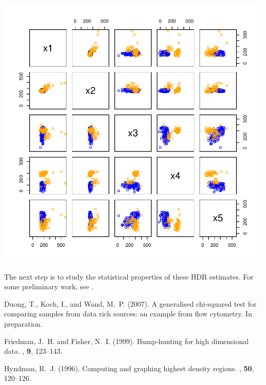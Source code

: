 \documentclass[a4paper,11pt]{article}
\begin{document}
\begin{Schunk}
\end{Schunk}

\begin{center}
\includegraphics{prim-014}
\end{center}

The next step is to study the statistical properties of these HDR estimates.
For some preliminary work, see \cite*{duong07b}.




\begin{thebibliography}{}

Duong, T., Koch, I., and Wand, M.~P. (2007).
\newblock A generalised chi-squared test for comparing samples from data rich
  sources: an example from flow cytometry.
\newblock In preparation.

Friedman, J.~H. and Fisher, N.~I. (1999).
\newblock Bump-hunting for high dimensional data.
, \textbf{9}, 123--143.

Hyndman, R.~J. (1996).
\newblock Computing and graphing highest density regions.
, \textbf{50}, 120--126.

\end{thebibliography}

%
\end{document}
